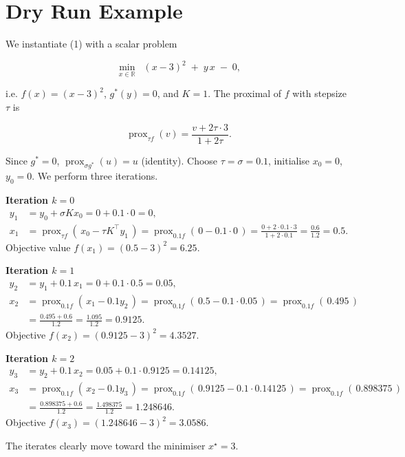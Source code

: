 \documentclass{article}
\newcommand{\prox}[2]{\operatorname{prox}_{#1}\!\left(#2\right)}
\begin{document}
\section*{Dry Run Example}
We instantiate (1) with a scalar problem  

\[
\min_{x\in\mathbb R}\;\; (x-3)^{2} \;+\; y\,x \;-\; 0,
\]

i.e. $f(x)=(x-3)^{2}$, $g^{*}(y)=0$, and $K=1$.  
The proximal of $f$ with stepsize $\tau$ is  

\[
\prox{\tau f}{v}= \frac{v+2\tau\cdot 3}{1+2\tau}.
\tag{3}
\]

Since $g^{*}=0$, $\prox{\sigma g^{*}}{u}=u$ (identity).  
Choose $\tau=\sigma=0.1$, initialise $x_{0}=0$, $y_{0}=0$.  
We perform three iterations.

\medskip
\noindent\textbf{Iteration $k=0$}
\begin{align*}
y_{1}&= y_{0}+\sigma K x_{0}=0+0.1\cdot 0 =0,\\
x_{1}&= \prox{\tau f}{\,x_{0}-\tau K^{\!\top}y_{1}\,}
      =\prox{0.1 f}{\,0-0.1\cdot 0\,}
      =\frac{0+2\cdot0.1\cdot 3}{1+2\cdot0.1}
      =\frac{0.6}{1.2}=0.5.
\end{align*}
Objective value $f(x_{1})=(0.5-3)^{2}=6.25$.

\medskip
\noindent\textbf{Iteration $k=1$}
\begin{align*}
y_{2}&= y_{1}+0.1\,x_{1}=0+0.1\cdot 0.5 =0.05,\\
x_{2}&= \prox{0.1 f}{\,x_{1}-0.1 y_{2}\,}
      =\prox{0.1 f}{\,0.5-0.1\cdot0.05\,}
      =\prox{0.1 f}{\,0.495\,}\\
      &=\frac{0.495+0.6}{1.2}= \frac{1.095}{1.2}=0.9125 .
\end{align*}
Objective $f(x_{2})=(0.9125-3)^{2}=4.3527$.

\medskip
\noindent\textbf{Iteration $k=2$}
\begin{align*}
y_{3}&= y_{2}+0.1\,x_{2}=0.05+0.1\cdot0.9125 =0.14125,\\
x_{3}&= \prox{0.1 f}{\,x_{2}-0.1 y_{3}\,}
      =\prox{0.1 f}{\,0.9125-0.1\cdot0.14125\,}
      =\prox{0.1 f}{\,0.898375\,}\\
      &=\frac{0.898375+0.6}{1.2}= \frac{1.498375}{1.2}=1.248646.
\end{align*}
Objective $f(x_{3})=(1.248646-3)^{2}=3.0586$.

The iterates clearly move toward the minimiser $x^{\star}=3$.
\end{document}
